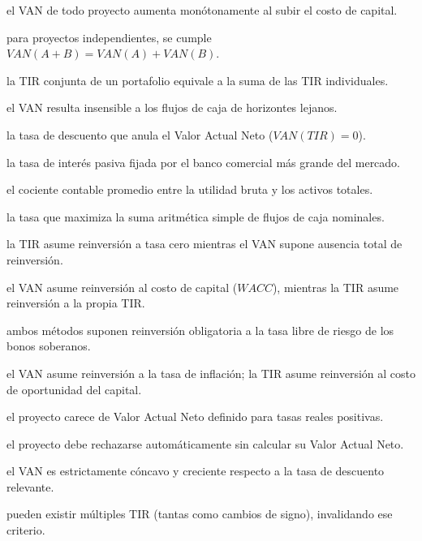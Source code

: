 \begin{opts}
    \item el VAN de todo proyecto aumenta monótonamente al subir el costo de capital.
    \item para proyectos independientes, se cumple $VAN(A+B) = VAN(A) + VAN(B)$.
    \item la TIR conjunta de un portafolio equivale a la suma de las TIR individuales.
    \item el VAN resulta insensible a los flujos de caja de horizontes lejanos.
\end{opts}

\begin{opts}
    \item la tasa de descuento que anula el Valor Actual Neto ($VAN(TIR) = 0$).
    \item la tasa de interés pasiva fijada por el banco comercial más grande del mercado.
    \item el cociente contable promedio entre la utilidad bruta y los activos totales.
    \item la tasa que maximiza la suma aritmética simple de flujos de caja nominales.
\end{opts}

\begin{opts}
    \item la TIR asume reinversión a tasa cero mientras el VAN supone ausencia total de reinversión.
    \item el VAN asume reinversión al costo de capital ($WACC$), mientras la TIR asume reinversión a la propia TIR.
    \item ambos métodos suponen reinversión obligatoria a la tasa libre de riesgo de los bonos soberanos.
    \item el VAN asume reinversión a la tasa de inflación; la TIR asume reinversión al costo de oportunidad del capital.
\end{opts}

\begin{opts}
    \item el proyecto carece de Valor Actual Neto definido para tasas reales positivas.
    \item el proyecto debe rechazarse automáticamente sin calcular su Valor Actual Neto.
    \item el VAN es estrictamente cóncavo y creciente respecto a la tasa de descuento relevante.
    \item pueden existir múltiples TIR (tantas como cambios de signo), invalidando ese criterio.
\end{opts}

